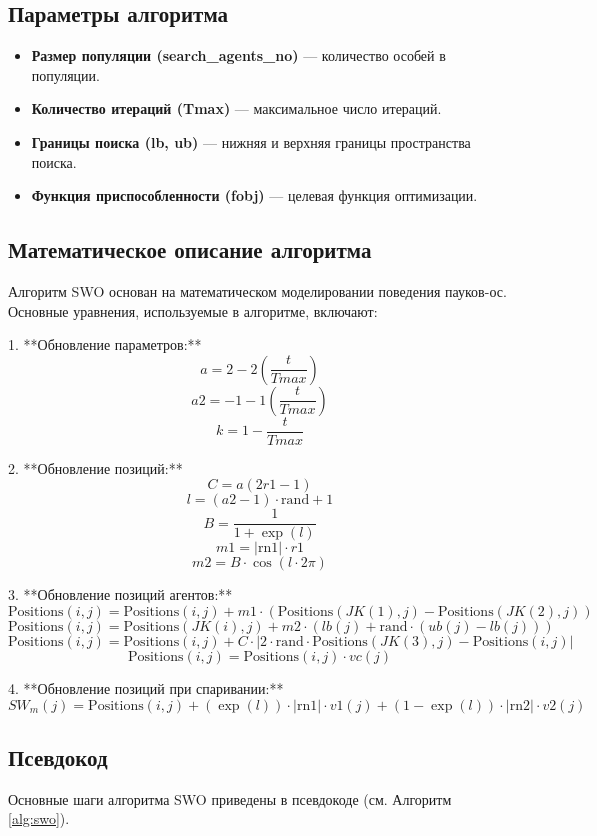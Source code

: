 \documentclass[a4paper,12pt]{article}
\begin{document}
\subsection{Параметры алгоритма}
\begin{itemize}
    \item \textbf{Размер популяции (search\_agents\_no)} — количество особей в популяции.
    \item \textbf{Количество итераций (Tmax)} — максимальное число итераций.
    \item \textbf{Границы поиска (lb, ub)} — нижняя и верхняя границы пространства поиска.
    \item \textbf{Функция приспособленности (fobj)} — целевая функция оптимизации.
\end{itemize}

\subsection{Математическое описание алгоритма}

Алгоритм SWO основан на математическом моделировании поведения пауков-ос. Основные уравнения, используемые в алгоритме, включают:

1. **Обновление параметров:**
   \[
   a = 2 - 2 \left(\frac{t}{Tmax}\right)
   \]
   \[
   a2 = -1 - 1 \left(\frac{t}{Tmax}\right)
   \]
   \[
   k = 1 - \frac{t}{Tmax}
   \]

2. **Обновление позиций:**
   \[
   C = a (2r1 - 1)
   \]
   \[
   l = (a2 - 1) \cdot \text{rand} + 1
   \]
   \[
   B = \frac{1}{1 + \exp(l)}
   \]
   \[
   m1 = |\text{rn1}| \cdot r1
   \]
   \[
   m2 = B \cdot \cos(l \cdot 2\pi)
   \]

3. **Обновление позиций агентов:**
   \[
   \text{Positions}(i,j) = \text{Positions}(i,j) + m1 \cdot (\text{Positions}(JK(1),j) - \text{Positions}(JK(2),j))
   \]
   \[
   \text{Positions}(i,j) = \text{Positions}(JK(i),j) + m2 \cdot (lb(j) + \text{rand} \cdot (ub(j) - lb(j)))
   \]
   \[
   \text{Positions}(i,j) = \text{Positions}(i,j) + C \cdot |2 \cdot \text{rand} \cdot \text{Positions}(JK(3),j) - \text{Positions}(i,j)|
   \]
   \[
   \text{Positions}(i,j) = \text{Positions}(i,j) \cdot vc(j)
   \]

4. **Обновление позиций при спаривании:**
   \[
   SW_m(j) = \text{Positions}(i,j) + (\exp(l)) \cdot |\text{rn1}| \cdot v1(j) + (1 - \exp(l)) \cdot |\text{rn2}| \cdot v2(j)
   \]

\subsection{Псевдокод}
Основные шаги алгоритма SWO приведены в псевдокоде (см. Алгоритм \ref{alg:swo}).
\end{document}

